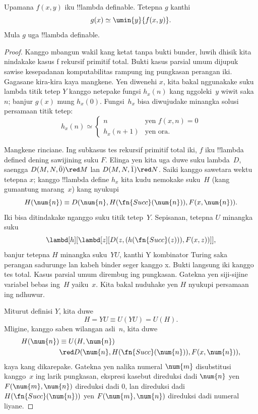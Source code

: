 \documentclass[../../../include/open-logic-section]{subfiles}
\begin{document}

\begin{lem}
Upamana $f(x,y)$ iku !!{lambda definable}.
Tetepna $g$ kanthi
\[
g(x) \simeq \umin{y}{f(x,y)}.
\]
Mula $g$ uga !!{lambda definable}.
\end{lem}

\begin{proof}
Kanggo mbangun wakil kang ketat tanpa bukti bunder, luwih dhisik kita nindakake kasus f rekursif primitif total. Bukti kasus parsial umum dijupuk sawise kesepadanan komputabilitas rampung ing pungkasan perangan iki. Gagasane kira-kira kaya mangkene. Yen
diwenehi $x$, kita bakal nggunakake
suku lambda titik tetep $Y$ kanggo
netepake fungsi $h_x(n)$ kang nggoleki~$y$
wiwit saka~$n$; banjur $g(x)$ mung
$h_x(0)$. Fungsi~$h_x$ bisa diwujudake
minangka solusi persamaan titik tetep:
\[
h_x(n) \simeq
\begin{cases}
n & \text{yen $f(x,n) = 0$} \\
h_x(n+1) & \text{yen ora.}
\end{cases}
\]

Mangkene rinciane. Ing subkasus tes rekursif primitif total iki, $f$ iku
!!{lambda defined} dening sawijining
suku $F$.
Elinga yen kita uga duwe suku
lambda~$D$, saengga
$D(M, N, \bar{0}) \red M$ lan
$D(M, N, \bar{1}) \red N$.
Saiki kanggo sawetara wektu tetepna
$x$; kanggo !!{lambda define} $h_x$
kita kudu nemokake suku~$H$
(kang gumantung marang~$x$)
kang nyukupi
\[
H(\num{n}) \equiv D(\num{n}, H(\fn{Succ}(\num{n})), F(x, \num{n})).
\]
Iki bisa ditindakake nganggo suku
titik tetep~$Y$. Sepisanan, tetepna
$U$ minangka suku
\[
\lambd[h][\lambd[z][D(z,(h(\fn{Succ}(z))),F(x,z))]],
\]
banjur tetepna $H$ minangka suku~$YU$, kanthi Y kombinator Turing saka perangan sadurunge lan kabeh binder seger kanggo x. Bukti langsung iki kanggo tes total. Kasus parsial umum dirembug ing pungkasan.
Gatekna yen siji-sijine variabel bebas
ing~$H$ yaiku~$x$. Kita bakal nuduhake
yen $H$ nyukupi persamaan ing ndhuwur.

Miturut definisi $Y$, kita duwe
\[
H = YU \equiv U(YU) = U(H).
\]
Mligine, kanggo saben wilangan asli~$n$,
kita duwe
\begin{align*}
H(\num{n}) & \equiv U(H, \num{n}) \\
& \red D(\num{n}, H(\fn{Succ}(\num{n})), F(x, \num{n})),
\end{align*}
kaya kang dikarepake. Gatekna yen
nalika numeral $\num{m}$ disubstitusi
kanggo~$x$ ing larik pungkasan,
ekspresi kasebut direduksi dadi
$\num{n}$ yen $F(\num{m},
\num{n})$ direduksi dadi $\num{0}$,
lan direduksi dadi
$H(\fn{Succ}(\num{n}))$ yen
$F(\num{m}, \num{n})$ direduksi
dadi numeral liyane.


\end{proof}
\end{document}
